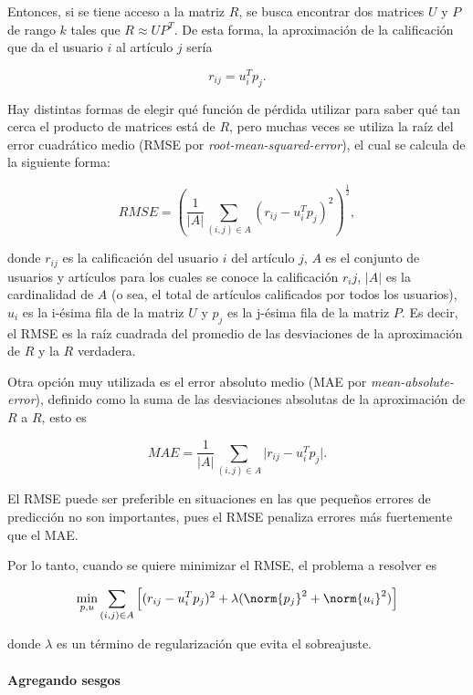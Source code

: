 Entonces, si se tiene acceso a la matriz $R$, se busca encontrar dos matrices $U$ y $P$ de rango $k$ tales que $R \approx U P^T$. De esta forma, la aproximación de la calificación que da el usuario $i$ al artículo $j$ sería

\begin{equation}\label{ec_fact_basico}
r_{ij} = u_i^T p_j.
\end{equation}


Hay distintas formas de elegir qué función de pérdida utilizar para saber qué tan cerca el producto de matrices está de $R$, pero muchas veces se utiliza la raíz del error cuadrático medio (RMSE por \textit{root-mean-squared-error}), el cual se calcula de la siguiente forma:

\[
RMSE = \left ( \frac{1}{\vert A \vert} \sum_{(i,j) \in A} (r_{ij} - u_i^Tp_j )^2 \right ) ^ \frac{1}{2},
\]

donde $r_{ij}$ es la calificación del usuario $i$ del artículo $j$, $A$ es el conjunto de usuarios y artículos para los cuales se conoce la calificación $r_ij$, $ \vert A \vert$ es la cardinalidad de $A$ (o sea, el total de artículos calificados por todos los usuarios), $u_i$ es la i-ésima fila de la matriz $U$ y $p_j$ es la j-ésima fila de la matriz $P$. Es decir, el RMSE es la raíz cuadrada del promedio de las desviaciones de la aproximación de $R$ y la $R$ verdadera. 

Otra opción muy utilizada es el error absoluto medio (MAE por \textit{mean-absolute-error}), definido como la suma de las desviaciones absolutas de la aproximación de $R$ a $R$, esto es

\[
MAE = \frac{1}{\vert A \vert} \sum_{(i,j) \in A} \vert r_{ij} - u_i^Tp_j \vert.
\]

El RMSE puede ser preferible en situaciones en las que pequeños errores de predicción no son importantes, pues el RMSE penaliza errores más fuertemente que el MAE.

Por lo tanto, cuando se quiere minimizar el RMSE, el problema a resolver es

\begin{equation}
\min_{p, u} \sum_{(i,j) \in A} \left [ (r_{ij} - u_i^Tp_j )^2 + \lambda ( \norm{p_j}^2 + \norm{u_i}^2 ) \right ]
\end{equation}

donde $\lambda$ es un término de regularización que evita el sobreajuste.

\paragraph{Agregando sesgos}

